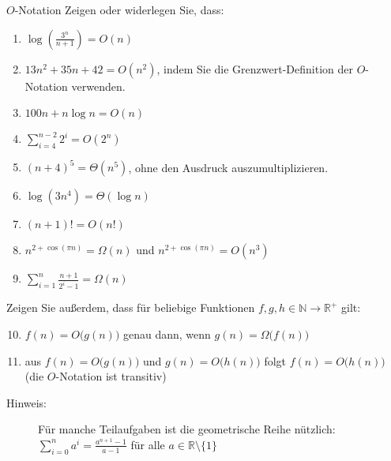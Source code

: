 \documentclass[11pt,a4paper]{article}
\begin{document}
\begin{aufgabe}{1}{$O$-Notation}
Zeigen oder widerlegen Sie, dass:
\begin{enumerate}
    \item $\operatorname{log}\left(\frac{3^n}{n + 1}\right) = O(n)$
    \item $13n^2 + 35n + 42 = O(n^2)$, indem Sie die Grenzwert-Definition der $O$-Notation verwenden.
    \item $100n + n \log n = O(n)$
    \item $\sum\limits_{i=4}^{n-2} 2^i = O(2^n)$
    \item $(n + 4)^5 = \Theta(n^5)$, ohne den Ausdruck auszumultiplizieren.
    \item $\log(3n^4) = \Theta(\log n)$
    \item $(n + 1)! = O(n!)$
    \item $n^{2 + \cos(\pi n)} = \Omega(n)$ und $n^{2 + \cos(\pi n)} = O(n^3)$
    \item $\sum\limits_{i=1}^{n} \frac{n + 1}{2^i - 1} = \Omega(n)$
\end{enumerate}
Zeigen Sie außerdem, dass für beliebige Funktionen $f, g, h \in \mathbb{N} \rightarrow \mathbb{R}^{+}$ gilt:
\begin{enumerate}
    \setcounter{enumi}{9}
    \item $f(n) = O\big(g(n)\big)$ genau dann, wenn $g(n) = \Omega\big(f(n)\big)$
    \item aus $f(n) = O\big(g(n)\big)$ und $g(n) = O\big(h(n)\big)$ folgt $f(n) = O\big(h(n)\big)$ (die $O$-Notation ist transitiv)
\end{enumerate}
\begin{description}
    \item[Hinweis:] Für manche Teilaufgaben ist die geometrische Reihe nützlich: $\sum\limits_{i=0}^n a^i = \frac{a^{n+1} - 1}{a - 1}$ für alle $a \in \mathbb{R} \setminus \{1\}$
\end{description}
\end{aufgabe}
\end{document}
